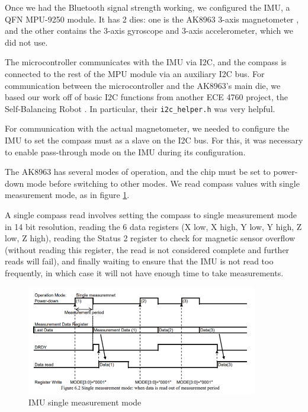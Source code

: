 \documentclass[]{article}
\begin{document}
Once we had the Bluetooth signal strength working, we configured the IMU,
a QFN MPU-9250 \cite{mpu9250datasheet} \cite{mpu9250regmap} module.
It has 2 dies: one is the AK8963 3-axis magnetometer \cite{ak8963cdatasheet},
and the other contains the 3-axis gyroscope and 3-axis accelerometer, which we did not use.

The microcontroller communicates with the IMU via I2C, and the compass is connected to the rest of the MPU module via an auxiliary I2C bus. For communication between the microcontroller and the AK8963's main die, we based our work off of basic I2C functions from another ECE 4760 project, the Self-Balancing Robot \cite{selfbalancingrobot}. In particular, their \texttt{i2c\_helper.h} was very helpful.

For communication with the actual magnetometer, we needed to configure the IMU to set the compass must as a slave on the I2C bus. For this, it was necessary to enable pass-through mode on the IMU during its configuration.

The AK8963 has several modes of operation, and the chip must be set to power-down mode before switching to other modes.
We read compass values with single measurement mode, as in figure \ref{fig:imu_single_measurement}.

A single compass read involves setting the compass to single measurement mode in 14 bit resolution, reading the 6 data registers (X low, X high, Y low, Y high, Z low, Z high), reading the Status 2 register to check for magnetic sensor overflow (without reading this register, the read is not considered complete and further reads will fail), and finally waiting to ensure that the IMU is not read too frequently, in which case it will not have enough time to take measurements.

\begin{figure}
  \centering
  \includegraphics[width=0.9\textwidth]{imu_single_measurement.png}
  \caption{IMU single measurement mode}
  \label{fig:imu_single_measurement}
\end{figure}
\end{document}
